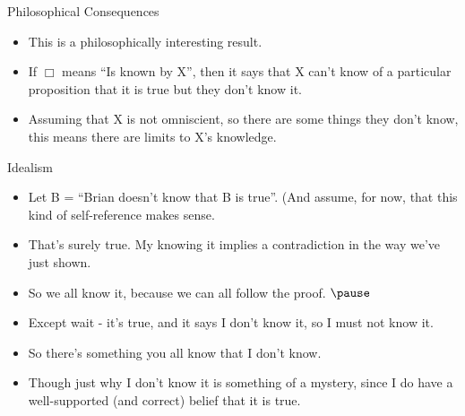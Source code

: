 \documentclass[
  ignorenonframetext,
]{beamer}
\providecommand{\tightlist}{%
  \setlength{\itemsep}{0pt}\setlength{\parskip}{0pt}}
\renewcommand{\,}{\text{, }}
\begin{document}
\begin{frame}{Philosophical Consequences}
\protect\hypertarget{philosophical-consequences}{}

\begin{itemize}
\tightlist
\item
  This is a philosophically interesting result.
\item
  If \(\Box\) means ``Is known by X'', then it says that X can't know of
  a particular proposition that it is true but they don't know it.
\item
  Assuming that X is not omniscient, so there are some things they don't
  know, this means there are limits to X's knowledge.
\end{itemize}

\end{frame}

\begin{frame}{Idealism}
\protect\hypertarget{idealism}{}

\begin{itemize}
\tightlist
\item
  Let B = ``Brian doesn't know that B is true''. (And assume, for now,
  that this kind of self-reference makes sense.
\item
  That's surely true. My knowing it implies a contradiction in the way
  we've just shown.
\item
  So we all know it, because we can all follow the proof. \(\pause\)
\item
  Except wait - it's true, and it says I don't know it, so I must not
  know it.
\item
  So there's something you all know that I don't know.
\item
  Though just why I don't know it is something of a mystery, since I do
  have a well-supported (and correct) belief that it is true.
\end{itemize}

\end{frame}
\end{document}
